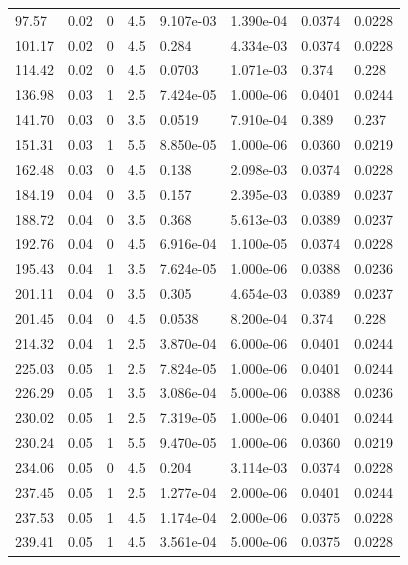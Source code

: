 \documentclass[preview]{standalone}
\begin{document}
{{\begin{tabular}{L{1.2cm}C{1.2cm} C{0.3cm}C{0.5cm} C{1.4cm}C{1.4cm} C{1.4cm}C{1.4cm}}
  97.57  &  0.02  & 0     & 4.5 &  9.107e-03  & 1.390e-04  & 0.0374 &  0.0228   \\ 
  101.17  &  0.02  & 0     & 4.5 &  0.284  & 4.334e-03  & 0.0374 &  0.0228   \\ 
  114.42  &  0.02  & 0     & 4.5 &  0.0703  & 1.071e-03  & 0.374 &  0.228   \\ 
  136.98  &  0.03  & 1     & 2.5 &  7.424e-05  & 1.000e-06  & 0.0401 &  0.0244   \\ 
  141.70  &  0.03  & 0     & 3.5 &  0.0519  & 7.910e-04  & 0.389 &  0.237   \\ 
  151.31  &  0.03  & 1     & 5.5 &  8.850e-05  & 1.000e-06  & 0.0360 &  0.0219   \\ 
  162.48  &  0.03  & 0     & 4.5 &  0.138  & 2.098e-03  & 0.0374 &  0.0228   \\ 
  184.19  &  0.04  & 0     & 3.5 &  0.157  & 2.395e-03  & 0.0389 &  0.0237   \\ 
  188.72  &  0.04  & 0     & 3.5 &  0.368  & 5.613e-03  & 0.0389 &  0.0237   \\ 
  192.76  &  0.04  & 0     & 4.5 &  6.916e-04  & 1.100e-05  & 0.0374 &  0.0228   \\ 
  195.43  &  0.04  & 1     & 3.5 &  7.624e-05  & 1.000e-06  & 0.0388 &  0.0236   \\ 
  201.11  &  0.04  & 0     & 3.5 &  0.305  & 4.654e-03  & 0.0389 &  0.0237   \\ 
  201.45  &  0.04  & 0     & 4.5 &  0.0538  & 8.200e-04  & 0.374 &  0.228   \\ 
  214.32  &  0.04  & 1     & 2.5 &  3.870e-04  & 6.000e-06  & 0.0401 &  0.0244   \\ 
  225.03  &  0.05  & 1     & 2.5 &  7.824e-05  & 1.000e-06  & 0.0401 &  0.0244   \\ 
  226.29  &  0.05  & 1     & 3.5 &  3.086e-04  & 5.000e-06  & 0.0388 &  0.0236   \\ 
  230.02  &  0.05  & 1     & 2.5 &  7.319e-05  & 1.000e-06  & 0.0401 &  0.0244   \\ 
  230.24  &  0.05  & 1     & 5.5 &  9.470e-05  & 1.000e-06  & 0.0360 &  0.0219   \\ 
  234.06  &  0.05  & 0     & 4.5 &  0.204  & 3.114e-03  & 0.0374 &  0.0228   \\ 
  237.45  &  0.05  & 1     & 2.5 &  1.277e-04  & 2.000e-06  & 0.0401 &  0.0244   \\ 
  237.53  &  0.05  & 1     & 4.5 &  1.174e-04  & 2.000e-06  & 0.0375 &  0.0228   \\ 
  239.41  &  0.05  & 1     & 4.5 &  3.561e-04  & 5.000e-06  & 0.0375 &  0.0228   \\ 

\end{tabular}}}
\end{document}
